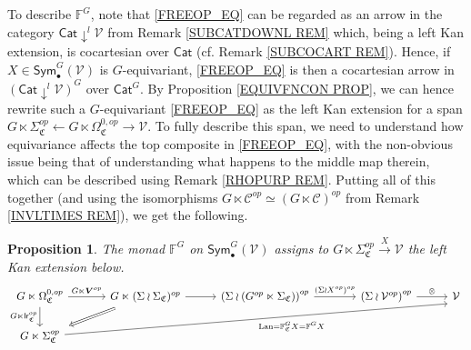 \documentclass[a4paper,10pt
,draft
]{article}%
\numberwithin{equation}{section}
\numberwithin{figure}{section}
\newtheorem{proposition}[equation]{Proposition}%
\theoremstyle{definition} %
\DeclareMathOperator{\Lan}{Lan}%
\newcommand{\V}{\ensuremath{\mathcal V}}
\newcommand{\1}{\ensuremath{\mathbbm 1}}%
\begin{document}
To describe $\mathbb{F}^G$,
note that \eqref{FREEOP_EQ}
can be regarded as an arrow in 
the category $\mathsf{Cat} \downarrow^l \V$
from Remark \ref{SUBCATDOWNL REM}
which, being a left Kan extension, is cocartesian over $\mathsf{Cat}$ (cf. Remark \ref{SUBCOCART REM}).
Hence, if $X \in \mathsf{Sym}_{\bullet}^G(\V)$
is $G$-equivariant, 
\eqref{FREEOP_EQ} is then a cocartesian arrow in 
$\left(\mathsf{Cat} \downarrow^l \V\right)^G$
over $\mathsf{Cat}^G$.
By Proposition \ref{EQUIVFNCON PROP},
we can hence rewrite 
such a $G$-equivariant \eqref{FREEOP_EQ}
as the left Kan extension for a span
$G \ltimes \Sigma^{op}_{\mathfrak{C}}
\leftarrow 
G \ltimes \Omega^{0,op}_{\mathfrak{C}}
\to 
\V$.
To fully describe this span,
we need to understand how equivariance 
affects the top composite in \eqref{FREEOP_EQ},
with the non-obvious issue being that of understanding
what happens to the middle map
therein, which can be described using
Remark \ref{RHOPURP REM}.
Putting all of this together
(and using the isomorphisms
$G \ltimes \mathcal{C}^{op} \simeq (G \ltimes \mathcal{C})^{op}$
from Remark \ref{INVLTIMES REM}),
we get the following.


\begin{proposition}\label{FGC PROP}
      The monad $\mathbb{F}^G$ on $\mathsf{Sym}^G_{\bullet}(\V)$
      assigns to 
      $G \ltimes \Sigma^{op}_{\mathfrak{C}} \xrightarrow{X} \V$
      the left Kan extension below.
\begin{equation}\label{FGC_EQ}
\begin{tikzcd}[column sep = 28pt]
	G \ltimes \Omega^{0,op}_{\mathfrak{C}}
	\arrow[d, "G \ltimes \mathsf{lr}_{\mathfrak C}^{op}"']
	\arrow[r, "G \ltimes \boldsymbol{V}^{op}"]
&[6pt]
	G \ltimes (\Sigma \wr \Sigma_{\mathfrak{C}})^{op} \arrow{r}
	\arrow[dl, Rightarrow, shorten >=0.15cm,shorten <=0.15cm]
&
	\left( \Sigma \wr \left( G^{op} \ltimes \Sigma_{\mathfrak{C}} \right) \right)^{op}
	\arrow[r, "(\Sigma \wr X^{op})^{op}"]
&[10pt]
	\left(\Sigma \wr \V^{op}\right)^{op} \arrow[r, "\otimes"]
&
	\V
\\
	G \ltimes \Sigma^{op}_{\mathfrak{C}}
	\arrow[urrrr, "\Lan = \mathbb F_{\mathfrak{C}}^G X = \mathbb F^G X"', end anchor = south west]
\end{tikzcd}
      \end{equation}
\end{proposition}
\end{document}

